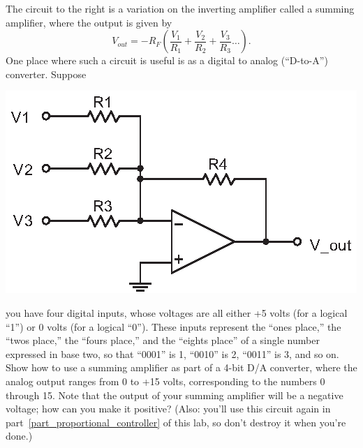 \begin{enumerate}[wide]
\begin{minipage}{.50\textwidth}
\item The circuit to the right is a variation on the inverting amplifier called a summing amplifier, where the output is given by \label{part_summer}
\begin{equation*}
V_{out} = -R_F \left( \frac{V_1}{R_1} + \frac{V_2}{R_2} +\frac{V_3}{R_3} \dots \right).
\end{equation*}
One place where such a circuit is useful is as a digital to analog (``D-to-A'') converter.  Suppose 
\end{minipage}
\begin{minipage}{.49\textwidth}
\begin{flushright}
\includegraphics{op-amps/summing_amp.eps}
\vspace*{0.2in}
\end{flushright}
\end{minipage}
you have four digital inputs, whose voltages are all either +5 volts (for a logical ``1'') or 0 volts (for a logical ``0'').  These inputs represent the ``ones place,'' the ``twos place,'' the ``fours place,'' and the ``eights place'' of a single number expressed in base two, so that ``0001'' is 1, ``0010'' is 2, ``0011'' is 3, and so on.  Show how to use a summing amplifier as part of a 4-bit D/A converter, where the analog output ranges from 0 to +15 volts, corresponding to the numbers 0 through 15.  Note that the output of your summing amplifier will be a negative voltage; how can you make it positive?  (Also: you'll use this circuit again in part~\ref{part_proportional_controller} of this lab, so don't destroy it when you're done.) 


\end{enumerate}
